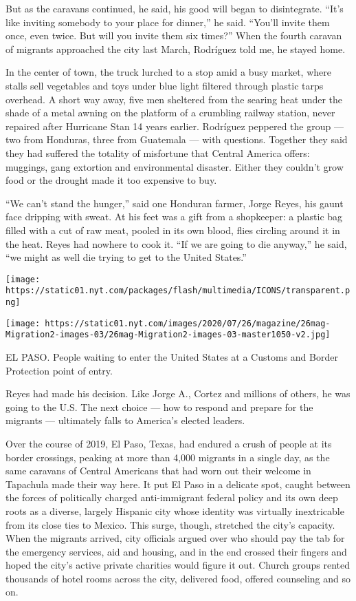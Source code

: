 But as the caravans continued, he said, his good will began to
disintegrate. ``It's like inviting somebody to your place for dinner,''
he said. ``You'll invite them once, even twice. But will you invite them
six times?'' When the fourth caravan of migrants approached the city
last March, Rodríguez told me, he stayed home.

In the center of town, the truck lurched to a stop amid a busy market,
where stalls sell vegetables and toys under blue light filtered through
plastic tarps overhead. A short way away, five men sheltered from the
searing heat under the shade of a metal awning on the platform of a
crumbling railway station, never repaired after Hurricane Stan 14 years
earlier. Rodríguez peppered the group --- two from Honduras, three from
Guatemala --- with questions. Together they said they had suffered the
totality of misfortune that Central America offers: muggings, gang
extortion and environmental disaster. Either they couldn't grow food or
the drought made it too expensive to buy.

``We can't stand the hunger,'' said one Honduran farmer, Jorge Reyes,
his gaunt face dripping with sweat. At his feet was a gift from a
shopkeeper: a plastic bag filled with a cut of raw meat, pooled in its
own blood, flies circling around it in the heat. Reyes had nowhere to
cook it. ``If we are going to die anyway,'' he said, ``we might as well
die trying to get to the United States.''

\texttt{[image: https://static01.nyt.com/packages/flash/multimedia/ICONS/transparent.png]}

\texttt{[image: https://static01.nyt.com/images/2020/07/26/magazine/26mag-Migration2-images-03/26mag-Migration2-images-03-master1050-v2.jpg]}

EL PASO. People waiting to enter the United States at a Customs and
Border Protection point of entry.

Reyes had made his decision. Like Jorge A., Cortez and millions of
others, he was going to the U.S. The next choice --- how to respond and
prepare for the migrants --- ultimately falls to America's elected
leaders.

Over the course of 2019, El Paso, Texas, had endured a crush of people
at its border crossings, peaking at more than 4,000 migrants in a single
day, as the same caravans of Central Americans that had worn out their
welcome in Tapachula made their way here. It put El Paso in a delicate
spot, caught between the forces of politically charged anti-immigrant
federal policy and its own deep roots as a diverse, largely Hispanic
city whose identity was virtually inextricable from its close ties to
Mexico. This surge, though, stretched the city's capacity. When the
migrants arrived, city officials argued over who should pay the tab for
the emergency services, aid and housing, and in the end crossed their
fingers and hoped the city's active private charities would figure it
out. Church groups rented thousands of hotel rooms across the city,
delivered food, offered counseling and so on.

